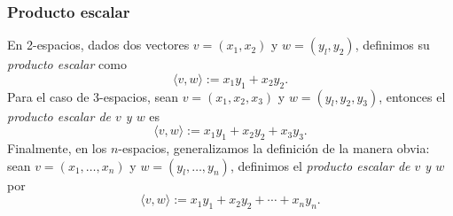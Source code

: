 \documentclass[handout]{beamer} %
\begin{document}
\begin{frame}\frametitle{Producto escalar}
			
	En 2-espacios, dados dos vectores $v = (x_1, x_2)$ y $w= (y_l, y_2)$, definimos su \textit{producto escalar} como
	\begin{equation*}
	\langle v , w  \rangle :=x_1y_1 + x_2y_2.
	\end{equation*}\pause
	Para el caso de 3-espacios, sean   $v = (x_1, x_2,x_3)$ y $w= (y_l, y_2,y_3)$,  entonces el \textit{producto escalar de $v$ y $w$} es
	\begin{equation*}
	\langle v , w  \rangle :=x_1y_1 + x_2y_2+x_3y_3.
	\end{equation*}\pause
	Finalmente, en los $n$-espacios,  generalizamos la definición de la manera obvia: sean  $v = (x_1, \ldots,x_n)$ y $w= (y_l, \ldots,y_n)$,  definimos el \textit{producto escalar de $v$ y $w$} por		
	\begin{equation*}
	\langle v , w \rangle :=x_1y_1 + x_2y_2+\cdots+x_ny_n.
	\end{equation*}
\end{frame}



\end{document}
